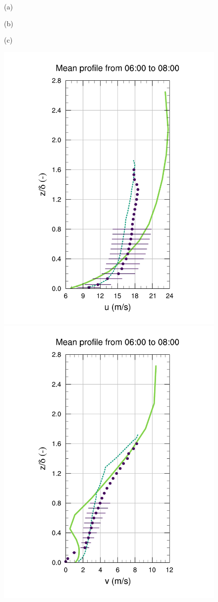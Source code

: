 \begin{figure}[H]
	\begin{minipage}{0.33\linewidth}
		\centering \hspace{1.5cm}(a)
	\end{minipage}%
	\begin{minipage}{0.33\linewidth}
		\centering \hspace{1cm}(b)
	\end{minipage}%
	\begin{minipage}{0.33\linewidth}
		\centering \hspace{1cm}(c)
	\end{minipage}%
	\vspace{-3mm}
	\begin{center}
	\includegraphics[height=0.62\linewidth,page=37,trim={35mm 10mm 41mm 25mm},clip]{Imagenes/06/hov/9u}%
	\includegraphics[height=0.62\linewidth,page=37,trim={48mm 10mm 41mm 25mm},clip]{Imagenes/06/hov/9v}%

\end{center}
\end{figure}
